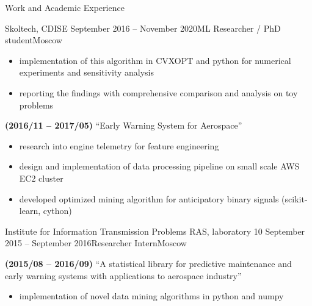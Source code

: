 \documentclass{resume} %
\begin{document}
\begin{rSection}{Work and Academic Experience}
\begin{rSubsection}{
        Skoltech, CDISE
    }{September 2016 -- November 2020}{ML Researcher / PhD student}{Moscow}
\begin{itemize}
        \item implementation of this algorithm in CVXOPT and python for numerical experiments and sensitivity analysis

        \item reporting the findings with comprehensive comparison and analysis on toy problems
    \end{itemize}

    \item \textbf{(2016/11 -- 2017/05)}
    ``Early Warning System for Aerospace''
    \begin{itemize}
        \item research into engine telemetry for feature engineering
        
        \item design and implementation of data processing pipeline on small scale AWS EC2 cluster

        \item developed optimized mining algorithm for anticipatory binary signals (scikit-learn, cython)
    \end{itemize}

\end{rSubsection}

\begin{rSubsection}{
        Institute for Information Transmission Problems RAS, laboratory 10
    }{September 2015 -- September 2016}{Researcher Intern}{Moscow}

    \item \textbf{(2015/08 -- 2016/09)}
    ``A statistical library for predictive maintenance and early warning systems with applications to aerospace industry''
    \begin{itemize}
        \item implementation of novel data mining algorithms in python and numpy


\end{itemize}
\end{rSubsection}
\end{rSection}
\end{document}
